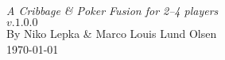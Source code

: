 



\begin{center}
	\Huge \textsc{\name}\\
	\normalsize \textit{A Cribbage \& Poker Fusion for 2--4 players}\\
	\large $v.1.0.0$\\\vspace{5mm}
	By Niko Lepka \& Marco Louis Lund Olsen\\
	\today
\end{center}




\newpage



